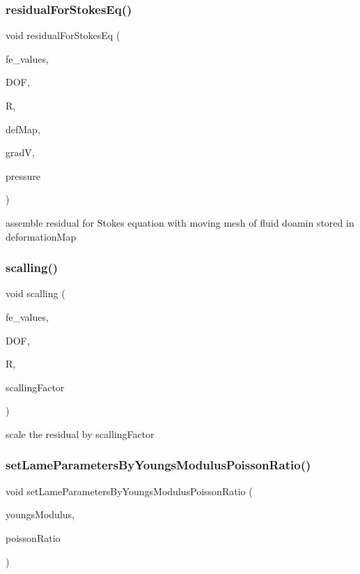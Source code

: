 \subsubsection{\texorpdfstring{residual\+For\+Stokes\+Eq()}{residualForStokesEq()}\hspace{0.1cm}{\footnotesize\ttfamily [2/2]}}
{\footnotesize\ttfamily void residual\+For\+Stokes\+Eq (\begin{DoxyParamCaption}\item[{const F\+E\+Values$<$ dim $>$ \&}]{fe\+\_\+values,  }\item[{unsigned int}]{D\+OF,  }\item[{Table$<$ 1, T $>$ \&}]{R,  }\item[{\mbox{\hyperlink{structdeformation_map}{deformation\+Map}}$<$ T, dim $>$ \&}]{def\+Map,  }\item[{Table$<$ 3, T $>$ \&}]{gradV,  }\item[{dealii\+::\+Table$<$ 1, T $>$ \&}]{pressure }\end{DoxyParamCaption})}

assemble residual for Stokes equation with moving mesh of fluid doamin stored in deformation\+Map \mbox{\label{class_residual_a339d8e3f5d146ad54951896c5f1e3d19}} 
\subsubsection{\texorpdfstring{scalling()}{scalling()}}
{\footnotesize\ttfamily void scalling (\begin{DoxyParamCaption}\item[{const F\+E\+Values$<$ dim $>$ \&}]{fe\+\_\+values,  }\item[{unsigned int}]{D\+OF,  }\item[{Table$<$ 1, Sacado\+::\+Fad\+::\+D\+Fad$<$ double $>$ $>$ \&}]{R,  }\item[{double}]{scalling\+Factor }\end{DoxyParamCaption})}

scale the residual by scalling\+Factor \mbox{\label{class_residual_a74a86942f009e483e946ac0a0036bd71}} 
\subsubsection{\texorpdfstring{set\+Lame\+Parameters\+By\+Youngs\+Modulus\+Poisson\+Ratio()}{setLameParametersByYoungsModulusPoissonRatio()}}
{\footnotesize\ttfamily void set\+Lame\+Parameters\+By\+Youngs\+Modulus\+Poisson\+Ratio (\begin{DoxyParamCaption}\item[{double}]{youngs\+Modulus,  }\item[{double}]{poisson\+Ratio }\end{DoxyParamCaption})}

